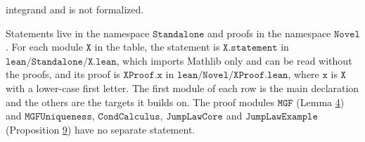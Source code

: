 \documentclass[11pt]{article}
\begin{document}
integrand and is not formalized.

Statements live in the namespace \(\texttt{Standalone}\) and proofs in the namespace \(\texttt{Novel}\). For each module \(\texttt{X}\) in the table, the statement is \(\texttt{X.statement}\) in \(\texttt{lean/Standalone/X.lean}\), which imports Mathlib only and can be read without the proofs, and its proof is \(\texttt{XProof.x}\) in \(\texttt{lean/Novel/XProof.lean}\), where \(\texttt{x}\) is \(\texttt{X}\) with a lower-case first letter. The first module of each row is the main declaration and the others are the targets it builds on. The proof modules \(\texttt{MGF}\) (Lemma \hyperref[res:Lemma-4]{4}) and \(\texttt{MGFUniqueness}\), \(\texttt{CondCalculus}\), \(\texttt{JumpLawCore}\) and \(\texttt{JumpLawExample}\) (Proposition \hyperref[res:Proposition-9]{9}) have no separate statement.
\end{document}
